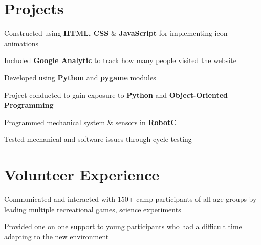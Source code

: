 \documentclass[]{morris-cv}
\begin{document}
\begin{minipage}[t]{0.67\textwidth}

\section{Projects}
\descript{}
\location{}
\begin{tightemize}
    \item Constructed using \textbf{HTML, CSS} \& \textbf{JavaScript} for implementing icon animations
    \item Included \textbf{Google Analytic} to track how many people visited the website
\end{tightemize}
\sectionsep

\descript{}
\location{}
\begin{tightemize}
    \item Developed using \textbf{Python} and \textbf{pygame} modules
    \item Project conducted to gain exposure to \textbf{Python} and \textbf{Object-Oriented Programming}
\end{tightemize}
\sectionsep

\descript{}
\location{}
\begin{tightemize}
    \item Programmed mechanical system \& sensors in \textbf{RobotC}
    \item Tested mechanical and software issues through cycle testing
\end{tightemize}
\sectionsep


\section{Volunteer Experience}
\begin{tightemize}
    \item Communicated and interacted with 150+ camp participants of all age groups by leading multiple recreational games, science experiments
    \item Provided one on one support to young participants who had a difficult time adapting to the new environment
\end{tightemize}
\sectionsep
\end{minipage} 
\end{document}
